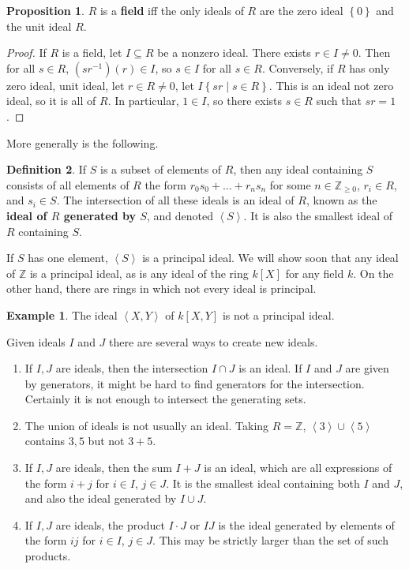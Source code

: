 \documentclass{article}
\newcommand{\Z}{\mathbb{Z}}
\newcommand{\rb}[1]{\left( #1 \right)}
\renewcommand{\sb}[1]{\left[ #1 \right]}
\newcommand{\cb}[1]{\left\{ #1 \right\}}
\newcommand{\ab}[1]{\left\langle #1 \right\rangle}
\theoremstyle{definition}\newtheorem{definition}{Definition}[subsection]
\theoremstyle{definition}\newtheorem{remark}[definition]{Remark}
\theoremstyle{definition}\newtheorem*{example}{Example}
\theoremstyle{definition}\newtheorem*{note}{Note}
\newtheorem{proposition}[definition]{Proposition}
\begin{document}
\begin{proposition}
$ R $ is a \textbf{field} iff the only ideals of $ R $ are the zero ideal $ \cb{0} $ and the unit ideal $ R $.
\end{proposition}

\begin{proof}
If $ R $ is a field, let $ I \subseteq R $ be a nonzero ideal. There exists $ r \in I \ne  0 $. Then for all $ s \in R $, $ \rb{sr^{-1}}\rb{r} \in I $, so $ s \in I $ for all $ s \in R $. Conversely, if $ R $ has only zero ideal, unit ideal, let $ r \in R \ne 0 $, let $ I \cb{sr \mid s \in R} $. This is an ideal not zero ideal, so it is all of $ R $. In particular, $ 1 \in I $, so there exists $ s \in R $ such that $ sr = 1 $.
\end{proof}

More generally is the following.

\begin{definition}
If $ S $ is a subset of elements of $ R $, then any ideal containing $ S $ consists of all elements of $ R $ the form $ r_0s_0 + \dots + r_ns_n $ for some $ n \in \Z_{\ge 0} $, $ r_i \in R $, and $ s_i \in S $. The intersection of all these ideals is an ideal of $ R $, known as the \textbf{ideal of $ R $ generated by $ S $}, and denoted $ \ab{S} $. It is also the smallest ideal of $ R $ containing $ S $.
\end{definition}

If $ S $ has one element, $ \ab{S} $ is a principal ideal. We will show soon that any ideal of $ \Z $ is a principal ideal, as is any ideal of the ring $ k\sb{X} $ for any field $ k $. On the other hand, there are rings in which not every ideal is principal.

\begin{example}
The ideal $ \ab{X, Y} $ of $ k\sb{X, Y} $ is not a principal ideal.
\end{example}

Given ideals $ I $ and $ J $ there are several ways to create new ideals.
\begin{enumerate}
\item If $ I, J $ are ideals, then the intersection $ I \cap J $ is an ideal. If $ I $ and $ J $ are given by generators, it might be hard to find generators for the intersection. Certainly it is not enough to intersect the generating sets.
\item The union of ideals is not usually an ideal. Taking $ R = \Z $, $ \ab{3} \cup \ab{5} $ contains $ 3, 5 $ but not $ 3 + 5 $.
\item If $ I, J $ are ideals, then the sum $ I + J $ is an ideal, which are all expressions of the form $ i + j $ for $ i \in I $, $ j \in J $. It is the smallest ideal containing both $ I $ and $ J $, and also the ideal generated by $ I \cup J $.
\item If $ I, J $ are ideals, the product $ I \cdot J $ or $ IJ $ is the ideal generated by elements of the form $ ij $ for $ i \in I $, $ j \in J $. This may be strictly larger than the set of such products.
\end{enumerate}
\end{document}

